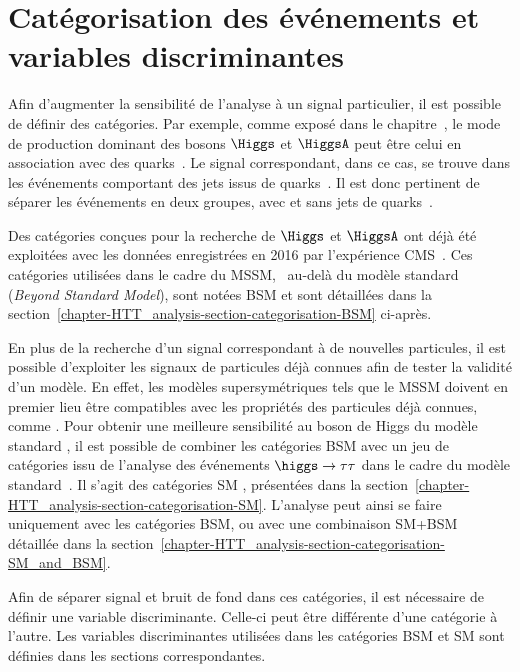 \section{Catégorisation des événements et variables discriminantes}\label{chapter-HTT_analysis-section-categorisation}
Afin d'augmenter la sensibilité de l'analyse à un signal particulier, il est possible de définir des catégories.
Par exemple, comme exposé dans le chapitre~, le mode de production dominant des bosons $\Higgs$ et $\HiggsA$ peut être celui en association avec des quarks~\quarkb.
Le signal correspondant, dans ce cas, se trouve dans les événements comportant des jets issus de quarks~\quarkb.
Il est donc pertinent de séparer les événements en deux groupes, avec et sans jets de quarks~\quarkb.
\par
Des catégories conçues pour la recherche de $\Higgs$ et $\HiggsA$ ont déjà été exploitées avec les données enregistrées en 2016 par l'expérience CMS~\cite{CMS-PAS-HIG-17-020}.
Ces catégories utilisées dans le cadre du MSSM, \ie\ au-delà du modèle standard (\emph{Beyond Standard Model}), sont notées \og BSM \fg{} et sont détaillées dans la section~\ref{chapter-HTT_analysis-section-categorisation-BSM} ci-après.
\par
En plus de la recherche d'un signal correspondant à de nouvelles particules, il est possible d'exploiter les signaux de particules déjà connues afin de tester la validité d'un modèle.
En effet, les modèles supersymétriques tels que le MSSM doivent en premier lieu être compatibles avec les propriétés des particules déjà connues, comme \higgs.
Pour obtenir une meilleure sensibilité au boson de Higgs du modèle standard \higgs, il est possible de combiner les catégories BSM avec un jeu de catégories issu de l'analyse des événements $\higgs\to\tau\tau$ dans le cadre du modèle standard~\cite{CMS-PAS-HIG-19-010,CMS-NOTE-2019-177,CMS-NOTE-2019-178}.
Il s'agit des catégories \og SM \fg, présentées dans la section~\ref{chapter-HTT_analysis-section-categorisation-SM}.
L'analyse peut ainsi se faire uniquement avec les catégories BSM, ou avec une combinaison SM+BSM détaillée dans la section~\ref{chapter-HTT_analysis-section-categorisation-SM_and_BSM}.
\par
Afin de séparer signal et bruit de fond dans ces catégories, il est nécessaire de définir une variable discriminante.
Celle-ci peut être différente d'une catégorie à l'autre.
Les variables discriminantes utilisées dans les catégories BSM et SM sont définies dans les sections correspondantes.

\newpage


